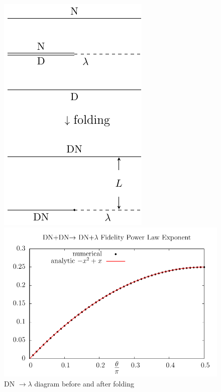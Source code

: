\documentclass{article}
\begin{document}
\begin{figure}[h]
\begin{minipage}[t]{0.3\linewidth}
\centering
\includegraphics[width=\textwidth]{fig_DN-lambda-folding}
\caption{DN $\rightarrow \lambda$ diagram before and after folding}
\label{fig:DN-lambda-folding}
\end{minipage}
\hfill
\begin{minipage}[t]{0.65\linewidth}
\centering
\includegraphics[width=\textwidth]{DN_DN2tan.pdf}

\end{minipage}
\end{figure}
\end{document}
